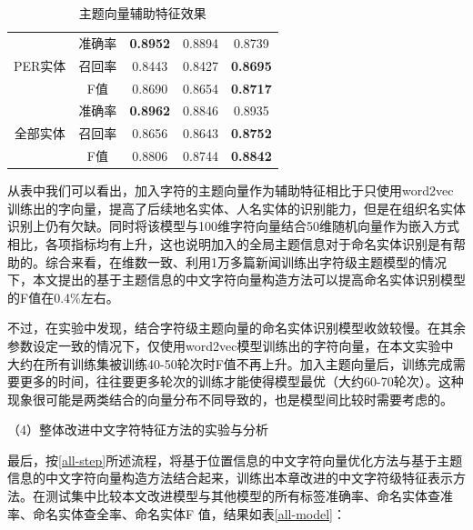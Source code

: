 \documentclass[winfonts,master,oneside,nobackinfo]{njuthesis}
\begin{document}
\begin{table}[h]
\begin{tabular}{|c|c|c|c|c|}
\multirow{3}{*}{PER实体} & 准确率 & \textbf{0.8952}  & 0.8894                                                    & 0.8739                                                    \\ \cline{2-5} 
                       & 召回率 & 0.8443  & 0.8427                                                    & \textbf{0.8695}                                                    \\ \cline{2-5} 
                       & F值  & 0.8690  & 0.8654                                                    & \textbf{0.8717}                                                    \\ \hline
\multirow{3}{*}{全部实体}  & 准确率 & \textbf{0.8962}  & 0.8846                                                    & 0.8935                                                    \\ \cline{2-5} 
                       & 召回率 & 0.8656  & 0.8643                                                    & \textbf{0.8752}                                                    \\ \cline{2-5} 
                       & F值  & 0.8806  & 0.8744                                                    & \textbf{0.8842}                                                    \\ \hline
\end{tabular}
\caption{主题向量辅助特征效果}
\label{exp-topic}
\end{table}

从表中我们可以看出，加入字符的主题向量作为辅助特征相比于只使用word2vec训练出的字向量，提高了后续地名实体、人名实体的识别能力，但是在组织名实体识别上仍有欠缺。同时将该模型与100维字符向量结合50维随机向量作为嵌入方式相比，各项指标均有上升，这也说明加入的全局主题信息对于命名实体识别是有帮助的。综合来看，在维数一致、利用1万多篇新闻训练出字符级主题模型的情况下，本文提出的基于主题信息的中文字符向量构造方法可以提高命名实体识别模型的F值在0.4\%左右。

不过，在实验中发现，结合字符级主题向量的命名实体识别模型收敛较慢。在其余参数设定一致的情况下，仅使用word2vec模型训练出的字符向量，在本文实验中大约在所有训练集被训练40-50轮次时F值不再上升。加入主题向量后，训练完成需要更多的时间，往往要更多轮次的训练才能使得模型最优（大约60-70轮次）。这种现象很可能是两类结合的向量分布不同导致的，也是模型间比较时需要考虑的。

（4）整体改进中文字符特征方法的实验与分析

最后，按\ref{all-step}所述流程，将基于位置信息的中文字符向量优化方法与基于主题信息的中文字符向量构造方法结合起来，训练出本章改进的中文字符级特征表示方法。在测试集中比较本文改进模型与其他模型的所有标签准确率、命名实体查准率、命名实体查全率、命名实体F
值，结果如表\ref{all-model}：
\end{document}
